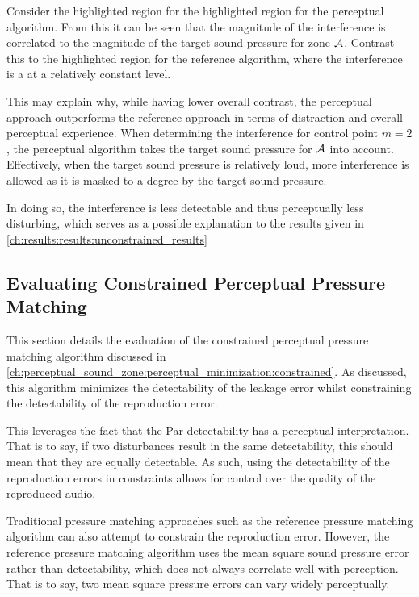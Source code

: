 Consider the highlighted region for the highlighted region for the perceptual algorithm.
From this it can be seen that the 
magnitude of the interference is correlated to the magnitude of the target sound pressure for zone $\mathcal{A}$.
Contrast this to the highlighted region for the reference algorithm, where the interference is a 
at a relatively constant level.

This may explain why, while having lower overall contrast, the perceptual approach outperforms the 
reference approach in terms of distraction and overall perceptual experience.
When determining the interference for control point $m=2$, the perceptual algorithm takes the 
target sound pressure for $\mathcal{A}$ into account. 
Effectively, when the target sound pressure is relatively loud, more interference is allowed 
as it is masked to a degree by the target sound pressure.

In doing so, the interference is less detectable and thus perceptually less disturbing, 
which serves as a possible explanation to the results given in \autoref{ch:results:results:unconstrained_results}

\subsection{Evaluating Constrained Perceptual Pressure Matching}
\label{ch:results:results:constrained_results}
This section details the evaluation of the constrained perceptual pressure matching algorithm discussed in 
\autoref{ch:perceptual_sound_zone:perceptual_minimization:constrained}.
As discussed, this algorithm minimizes the detectability of the leakage error whilst constraining the detectability of the 
reproduction error.

This leverages the fact that the Par detectability has a perceptual interpretation.
That is to say, if two disturbances result in the same detectability, this should mean that they are equally detectable.
As such, using the detectability of the reproduction errors in constraints allows for control over the 
quality of the reproduced audio.

Traditional pressure matching approaches such as the reference pressure matching algorithm can also attempt to constrain the 
reproduction error.
However, the reference pressure matching algorithm uses the mean square sound pressure error rather than detectability,
which does not always correlate well with perception.
That is to say, two mean square pressure errors can vary widely perceptually.

